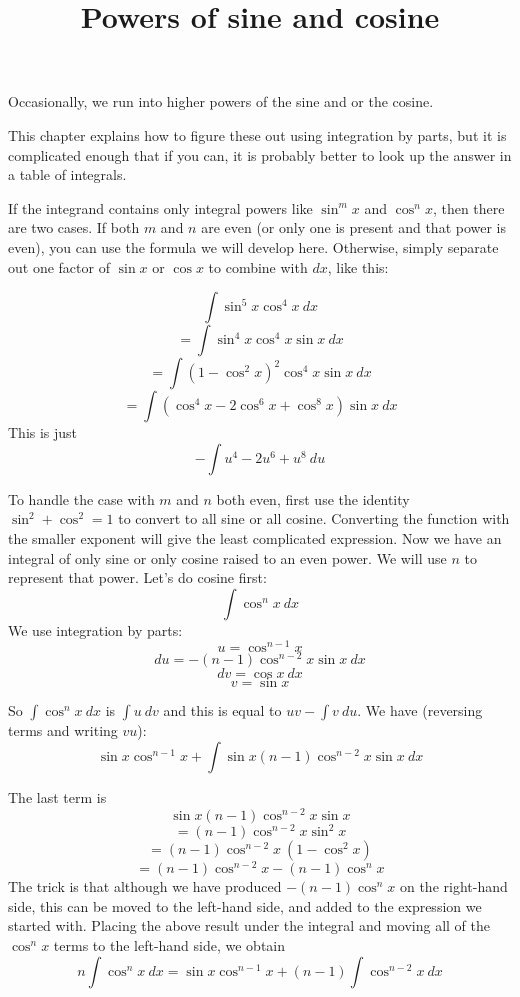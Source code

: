 \documentclass[11pt, oneside]{article}
\title{Powers of sine and cosine}
\date{}
\begin{document}
\maketitle
\Large

Occasionally, we run into higher powers of the sine and or the cosine.

This chapter explains how to figure these out using integration by parts, but it is complicated enough that if you can, it is probably better to look up the answer in a table of integrals.

If the integrand contains only integral powers like $\sin^m x$ and $\cos^n x$, then there are two cases.  If both $m$ and $n$ are even (or only one is present and that power is even), you can use the formula we will develop here.  Otherwise, simply separate out one factor of $\sin x$ or $\cos x$ to combine with $dx$, like this:

\[ \int \sin^5 x \cos^4 x \ dx \]
\[ = \int \sin^4 x \cos^4 x \sin x \ dx \]
\[ = \int (1- \cos^2 x)^2 \cos^4 x \sin x \ dx \]
\[ = \int (\cos^4 x - 2 \cos^6 x + \cos^8 x) \sin x \ dx \]
This is just
\[ -\int u^4 - 2u^6 + u^8 \ du \]

To handle the case with $m$ and $n$ both even, first use the identity $\sin^2 + \cos^2 = 1$ to convert to all sine or all cosine.  Converting the function with the smaller exponent will give the least complicated expression.  Now we have an integral of only sine or only cosine raised to an even power.  We will use $n$ to represent that power.  Let's do cosine first:
\[ \int \cos^n x \ dx \]
We use integration by parts:
\[ u = \cos^{n-1} x \]
\[ du = -(n-1)\cos^{n-2} x \sin x \ dx \]
\[ dv = \cos x \ dx \]
\[ v = \sin x \]

So $\int \cos^n x \ dx$ is $\int u \ dv$ and this is equal to $uv - \int v \ du$.  We have (reversing terms and writing $vu$):
\[ \sin x \cos^{n-1} x + \int \sin x (n-1) \cos^{n-2} x \sin x \ dx \]

The last term is
\[ \sin x (n-1) \cos^{n-2} x \sin x \]
\[ = (n-1) \cos^{n-2} x \sin^2 x  \]
\[ = (n-1) \cos^{n-2} x \ (1 - \cos^2 x)  \]
\[ = (n-1) \cos^{n-2} x - (n-1) \cos^n x \]
The trick is that although we have produced $- (n-1) \cos^n x$ on the right-hand side, this can be moved to the left-hand side, and added to the expression we started with.  Placing the above result under the integral and moving all of the $\cos^n x$ terms to the left-hand side, we obtain
\[ n \int \cos^n x \ dx =   \sin x \cos^{n-1} x +  (n-1) \int \cos^{n-2} x \ dx \]
\end{document}
